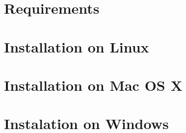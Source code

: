 \section{Requirements}
\section{Installation on Linux}
\section{Installation on Mac OS X}
\section{Instalation on Windows}

